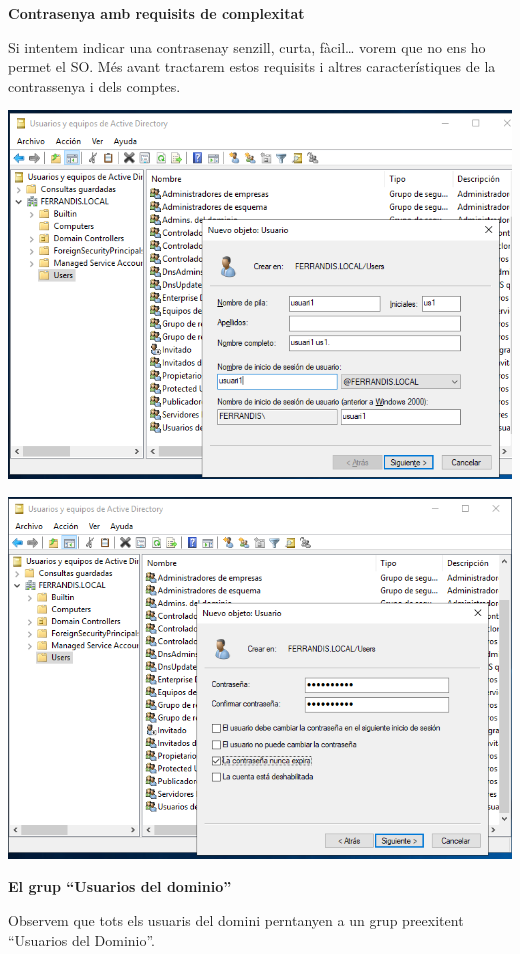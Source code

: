 \documentclass[
  a4paper,
]{article}
\begin{document}
\textbf{Contrasenya amb requisits de complexitat}

Si intentem indicar una contrasenay senzill, curta, fàcil\ldots{} vorem
que no ens ho permet el SO. Més avant tractarem estos requisits i altres
característiques de la contrassenya i dels comptes.

\includegraphics{png/creausuaridomini.png}

\includegraphics{png/creausuaridominicontrasenya.png}

\textbf{El grup ``Usuarios del dominio''}

Observem que tots els usuaris del domini perntanyen a un grup preexitent
``Usuarios del Dominio''.
\end{document}
